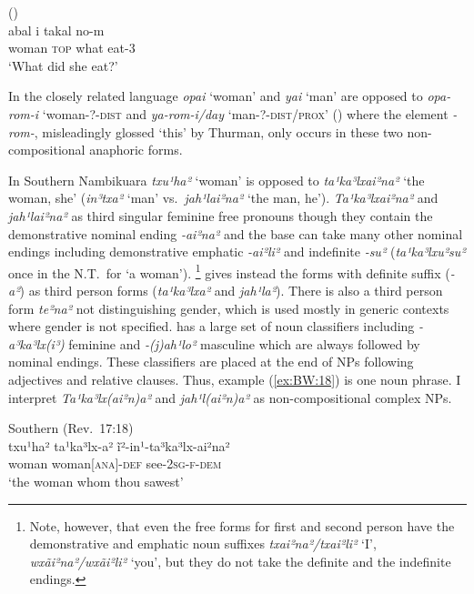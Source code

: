 \documentclass[output=collectionpaper]{langsci/langscibook}
\begin{document}
\ea\label{ex:BW:17}
 (\citealt[35]{Lee2005})\\
\gll abal 	i 	takal 	no-m \\
woman	\textsc{top} 	what 	eat-3\\
\glt ‘What did she eat?’\\
\z

In the closely related language  \textit{opai} ‘woman’ and \textit{yai} ‘man’ are opposed to \textit{opa-rom-i} ‘woman-?-\textsc{dist} and \textit{ya-rom-i/day} ‘man-?-\textsc{dist/prox}’ (\citealt{Thurman1987}) where the element \textit{-rom-}, misleadingly glossed ‘this’ by Thurman, only occurs in these two non-compositional anaphoric forms.

In Southern {Nambikuara} 
\textit{txu¹ha²} ‘woman’ is opposed to \textit{ta¹ka³lxai²na²} ‘the woman, she’ (\textit{in³txa²} ‘man’ vs.\ \textit{jah¹lai²na²} ‘the man, he’). \textit{Ta¹ka³lxai²na²} and \textit{jah¹lai²na²}  as third singular feminine free pronouns   though they contain the demonstrative nominal ending \textit{-ai²na²} and the base can take many other nominal endings including demonstrative emphatic \mbox{\textit{-ai²li²}} and indefinite \textit{-su²} (\textit{ta¹ka³lxu²su²} once in the N.T.\ for ‘a woman’).%
\footnote{%
Note, however, that even the free forms for first and second person have the demonstrative and emphatic noun suffixes \textit{txai²na²/txai²li²} ‘I’, \textit{wxãi²na²/wxãi²li²} ‘you’, but they do not take the definite and the indefinite endings.
} %
\citet[71]{Kroeker2001} gives instead the forms with definite suffix (\textit{-a²}) as third person forms (\textit{ta¹ka³lxa²} and \textit{jah¹la²}). There is also a third person form \textit{te²na²} not distinguishing gender, which is used mostly in generic contexts where gender is not specified.  has a large set of noun classifiers including \textit{-a³ka³lx(i³)} feminine and \textit{-(j)ah¹lo²} masculine which are always followed by nominal endings. These classifiers are placed at the end of NPs following adjectives and relative clauses. Thus, example (\ref{ex:BW:18}) is one noun phrase. I interpret \textit{Ta¹ka³lx(ai²n)a²} and \textit{jah¹l(ai²n)a²} as non-compositional complex NPs.

\ea\label{ex:BW:18}
Southern  (Rev.~17:18)\\
\gll txu¹ha²	ta¹ka³lx-a²	ĩ²-in¹-ta³ka³lx-ai²na²	\\
woman	woman[\textsc{ana}]-\textsc{def}	see-\textsc{2sg-f-dem}\\
\glt ‘the woman whom thou sawest’\\
\z
\end{document}
